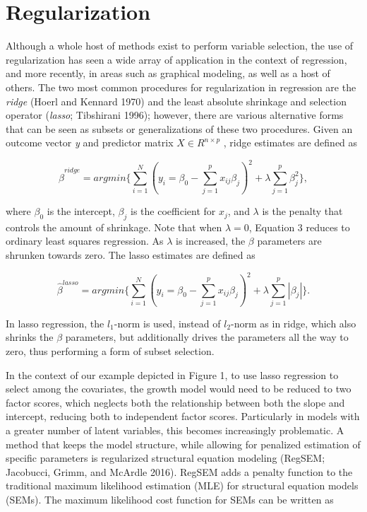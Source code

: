 \documentclass[article]{jss}
\begin{document}
\section{Regularization}\label{regularization}

Although a whole host of methods exist to perform variable selection,
the use of regularization has seen a wide array of application in the
context of regression, and more recently, in areas such as graphical
modeling, as well as a host of others. The two most common procedures
for regularization in regression are the \textit{ridge} (Hoerl and
Kennard 1970) and the least absolute shrinkage and selection operator
(\textit{lasso}; Tibshirani 1996); however, there are various
alternative forms that can be seen as subsets or generalizations of
these two procedures. Given an outcome vector \textit{y} and predictor
matrix \(X \in {R}^{n \times p}\) , ridge estimates are defined as

\[\tag{1}
\hat{\beta}^{ridge}= argmin \Big\{ \sum_{i=1}^{N} (y_{i} = \beta_{0} - \sum_{j=1}^{p}x_{ij} \beta_{j})^{2}  + \lambda \sum_{j=1}^{p} \beta_{j}^{2}\Big\},
\]

where \(\beta_{0}\) is the intercept, \(\beta_{j}\) is the coefficient
for \(x_{j}\), and \(\lambda\) is the penalty that controls the amount
of shrinkage. Note that when \(\lambda = 0\), Equation 3 reduces to
ordinary least squares regression. As \(\lambda\) is increased, the
\(\beta\) parameters are shrunken towards zero. The lasso estimates are
defined as

\[\tag{2}
\hat{\beta}^{lasso}= argmin \Big\{ \sum_{i=1}^{N} (y_{i} = \beta_{0} - \sum_{j=1}^{p}x_{ij} \beta_{j})^{2}  + \lambda \sum_{j=1}^{p}|\beta_{j}|\Big\}.
\]

In lasso regression, the \(l_{1}\)-norm is used, instead of
\(l_{2}\)-norm as in ridge, which also shrinks the \(\beta\) parameters,
but additionally drives the parameters all the way to zero, thus
performing a form of subset selection.

In the context of our example depicted in Figure 1, to use lasso
regression to select among the covariates, the growth model would need
to be reduced to two factor scores, which neglects both the relationship
between both the slope and intercept, reducing both to independent
factor scores. Particularly in models with a greater number of latent
variables, this becomes increasingly problematic. A method that keeps
the model structure, while allowing for penalized estimation of specific
parameters is regularized structural equation modeling (RegSEM;
Jacobucci, Grimm, and McArdle 2016). RegSEM adds a penalty function to
the traditional maximum likelihood estimation (MLE) for structural
equation models (SEMs). The maximum likelihood cost function for SEMs
can be written as
\end{document}
